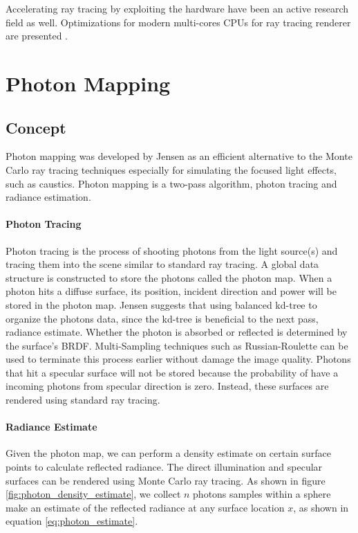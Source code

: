 Accelerating ray tracing by exploiting the hardware have been an active research field as well. Optimizations for modern multi-cores CPUs for ray tracing renderer are presented \cite{Wald:2002:IGI:581896.581899}.

\section{Photon Mapping}

\subsection{Concept}

Photon mapping was developed by Jensen \cite{HenrikWannJensen2004} as an efficient alternative to the Monte Carlo ray tracing techniques especially for simulating the focused light effects, such as caustics. Photon mapping is a two-pass algorithm, photon tracing and radiance estimation.

\paragraph{Photon Tracing}
Photon tracing is the process of shooting photons from the light source(s) and tracing them into the scene similar to standard ray tracing. A global data structure is constructed to store the photons called the photon map. When a photon hits a diffuse surface, its position, incident direction and power will be stored in the photon map. Jensen suggests that using balanced kd-tree \cite{Bentley:1975:MBS:361002.361007} to organize the photons data, since the kd-tree is beneficial to the next pass, radiance estimate. Whether the photon is absorbed or reflected is determined by the surface's BRDF. Multi-Sampling techniques such as Russian-Roulette \cite{Neulander:2011:AIS:2037826.2037876} can be used to terminate this process earlier without damage the image quality. Photons that hit a specular surface will not be stored because the probability of have a incoming photons from specular direction is zero. Instead, these surfaces are rendered using standard ray tracing.

\paragraph{Radiance Estimate}
Given the photon map, we can perform a density estimate on certain surface points to calculate reflected radiance. The direct illumination and specular surfaces can be rendered using Monte Carlo ray tracing. As shown in figure \ref{fig:photon_density_estimate}, we collect \(n\) photons samples within a sphere make an estimate of the reflected radiance at any surface location \(x\), as shown in equation \ref{eq:photon_estimate}.

